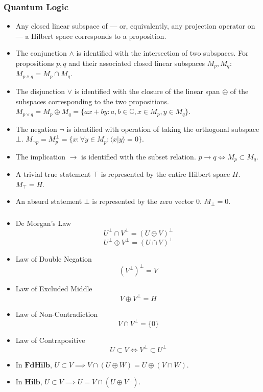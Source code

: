 \documentclass[UTF8,11pt,colorlinks,compress,openany]{beamer}%
\begin{document}
\begin{frame}\frametitle{Quantum Logic}
\begin{itemize}
	\item Any closed linear subspace of --- or, equivalently, any projection operator on --- a Hilbert space corresponds to a proposition.
	\item The conjunction $\wedge$ is identified with the intersection of two subspaces. For propositions $p,q$ and their associated closed linear subspaces $M_p,M_q$: $M_{p\wedge q}=M_p\cap M_q$.
	\item The disjunction $\vee$ is identified with the closure of the linear span $\oplus$ of the subspaces corresponding to the two propositions. $M_{p\vee q}=M_p\oplus M_q=\{ax+by: a,b\in\mathbb{C}, x\in M_p, y\in M_q\}$.
	\item The negation $\neg$ is identified with operation of taking the orthogonal subspace $\bot$. $M_{\neg p}=M_p^\bot=\{x:\forall y\in M_p:\langle x|y\rangle=0\}$.
	\item The implication $\to$ is identified with the subset relation. $p\to q\iff M_p\subset M_q$.
	\item A trivial true statement $\top$ is represented by the entire Hilbert space $H$. $M_\top=H$.
	\item An absurd statement $\bot$ is represented by the zero vector $0$. $M_\bot=0$.
\end{itemize}
\end{frame}

\begin{frame}\frametitle{}
\begin{itemize}
	\item De Morgan's Law
	\[U^\bot\cap V^\bot=(U\oplus V)^\bot\]
	\[U^\bot\oplus V^\bot=(U\cap V)^\bot\]
	\item Law of Double Negation
	\[(V^\bot)^\bot=V\]
	\item Law of Excluded Middle
	\[V\oplus V^\bot=H\]
	\item Law of Non-Contradiction
	\[V\cap V^\bot=\{0\}\]
	\item Law of Contrapositive
	\[U\subset V\iff V^\bot\subset U^\bot\]
	\item In $\mathbf{FdHilb}$, $U\subset V\implies V\cap (U\oplus W)=U\oplus(V\cap W)$.
	\item In $\mathbf{Hilb}$, $U\subset V\implies U=V\cap(U\oplus V^\bot)$.
\end{itemize}
\end{frame}
\end{document}
